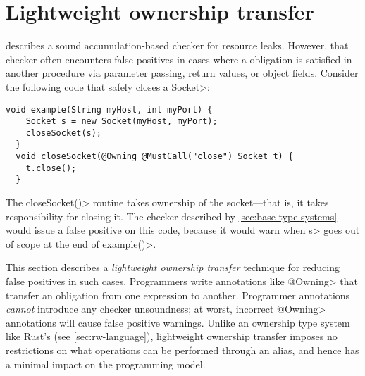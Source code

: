 \section{Lightweight ownership transfer}
\label{sec:lightweight-ownership}



 describes a sound accumulation-based
checker for resource leaks. However, that checker often encounters false
positives in cases where a \MustCall obligation is satisfied
in another procedure via parameter passing, return values, or object fields.
Consider the following code that safely closes a \<Socket>:

\begin{lstlisting}[frame=tb,belowskip=3mm]
  void example(String myHost, int myPort) {
    Socket s = new Socket(myHost, myPort);
    closeSocket(s);
  }
  void closeSocket(@Owning @MustCall("close") Socket t) {
    t.close();
  }  
\end{lstlisting}

The \<closeSocket()> routine takes ownership of the socket---that is,
it takes responsibility for closing it. The checker described by
\cref{sec:base-type-systems} would issue a false positive on this
code, because it would warn when \<s>
goes out of scope at the end of \<example()>.

This section describes a \emph{lightweight ownership transfer} technique for reducing
false positives in such cases.
Programmers write annotations like \<@Owning> that transfer an
obligation from one expression to another.
Programmer
annotations \emph{cannot} introduce any checker unsoundness; at worst,
incorrect \<@Owning> annotations will cause false positive warnings.
Unlike an ownership type system like Rust's (see \cref{sec:rw-language}),
lightweight ownership transfer imposes no restrictions on what operations can be performed
through an alias, and hence has a minimal impact on the programming model.

